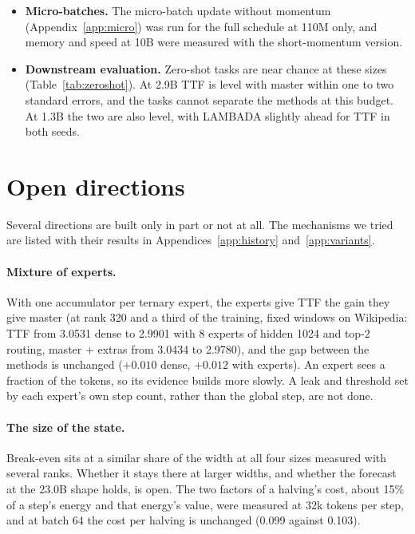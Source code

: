 \documentclass[10pt,twocolumn]{article}
\begin{document}
\begin{itemize}
  down projections' moved share rose only from 0.69 to 0.70. One run does not measure the run-to-run spread, the full
  schedule is untested, and the option is not in the released code.
\item \textbf{Micro-batches.} The micro-batch update without momentum (Appendix~\ref{app:micro}) was run for the full
  schedule at 110M only, and memory and speed at 10B were measured with the short-momentum version.
\item \textbf{Downstream evaluation.} Zero-shot tasks are near chance at these sizes (Table~\ref{tab:zeroshot}). At 2.9B
  TTF is level with master within one to two standard errors, and the tasks cannot separate the methods at this
  budget. At 1.3B the two are also level, with LAMBADA slightly ahead for TTF in both seeds.
\end{itemize}

\section{Open directions}\label{sec:open}
Several directions are built only in part or not at all. The mechanisms we tried are listed with their results in
Appendices~\ref{app:history} and~\ref{app:variants}.

\paragraph{Mixture of experts.} With one accumulator per ternary expert, the experts give TTF the gain they give master
(at rank 320 and a third of the training, fixed windows on Wikipedia: TTF from 3.0531 dense to 2.9901 with 8 experts of
hidden 1024 and top-2 routing, master + extras from 3.0434 to 2.9780), and the gap between the methods is unchanged
($+0.010$ dense, $+0.012$ with experts). An expert sees a fraction of the tokens, so its evidence builds more slowly. A
leak and threshold set by each expert's own step count, rather than the global step, are not done.

\paragraph{The size of the state.} Break-even sits at a similar share of the width at all four sizes measured with
several ranks. Whether it stays there at larger widths, and whether the forecast at the 23.0B shape holds, is open. The
two factors of a halving's cost, about 15\% of a step's energy and that energy's value, were measured at 32k tokens per
step, and at batch 64 the cost per halving is unchanged (0.099 against 0.103).
\end{document}
